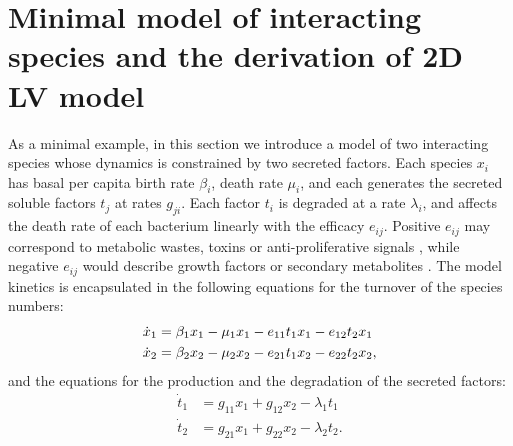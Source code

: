 \section{Minimal model of interacting species and the derivation of 2D LV model} %
As a minimal example, in this section we introduce a model of two interacting species whose dynamics is constrained by two secreted factors. Each species $x_i$ has basal per capita birth rate $\beta_i$, death rate $\mu_i$, and each generates the secreted soluble factors $t_j$ at rates $g_{ji}$. Each factor $t_i$ is degraded at a rate $\lambda_i$, and affects the death rate of each bacterium linearly with the efficacy $e_{ij}$. Positive $e_{ij}$ may correspond to metabolic wastes, toxins or anti-proliferative signals \cite{Jacob1989,Maplestone1992,VanMelderen2009,Rankin2012,Shen2015,Wynn2015}, while negative $e_{ij}$ would describe growth factors or secondary metabolites \cite{Maplestone1992,Reya2001,Wink2003}. The model kinetics is encapsulated in the following equations for the turnover of the species numbers:
\begin{align}
\dot{x}_1 &= \beta_1 x_1 - \mu_1 x_1 - e_{11} t_1 x_1 - e_{12} t_2 x_1 \notag \\
\dot{x}_2 &= \beta_2 x_2 - \mu_2 x_2 - e_{21} t_1 x_2 - e_{22} t_2 x_2 \label{eq-x-tox},
\end{align}
and the equations for the production and the degradation of the secreted factors:
\begin{align}
\dot{t}_1 &= g_{11} x_1 + g_{12}x_2 - \lambda_1 t_1  \nonumber \\
\dot{t}_2 &= g_{21} x_1 + g_{22}x_2 - \lambda_2 t_2. \label{eq-tox}
\end{align}

